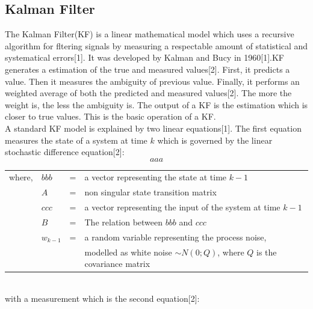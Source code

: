 \subsection{Kalman Filter}
The Kalman Filter(KF) is a linear mathematical model which uses a recursive algorithm for fltering signals by measuring a respectable amount of statistical and systematical errors[1]. It was developed by Kalman and Bucy in 1960[1].KF generates a estimation of the true and measured values[2]. First, it predicts a value. Then it measures the ambiguity of previous value. Finally, it performs an weighted average of both the predicted and measured values[2].
The more the weight is, the less the ambiguity is. The output of a KF is the estimation which is closer to true values. This is the basic operation of a KF.\\
A standard KF model is explained by two linear equations[1]. The first equation measures the state of a system at time $k$ which is governed by the linear stochastic difference equation[2]:
$$aaa$$
\begin{table}[!htbp]
\centering
\label{my-label}
\begin{tabular}{llll}
where, & $bbb$     & = & a vector representing the state at time $k-1$                                                                                                                                         \\
       & $A$       & = & non singular state transition matrix                                                                                                                                                  \\
       & $ccc$     & = & a vector representing the input of the system at time $k-1$                                                                                                                           \\
       & $B$       & = & The relation between $bbb$ and $ccc$                                                                                                                                                  \\
       & $w_{k-1}$ & = & a random variable representing the process noise, \\
       &        & & modelled as white noise $\sim N(0; Q)$, where $Q$ is the covariance matrix
\end{tabular}
\end{table}\\
with a measurement which is the second equation[2]:
